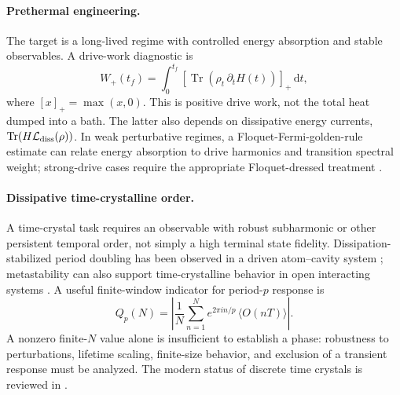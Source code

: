 \documentclass[10pt,twoside]{article}
\DeclareMathOperator{\Tr}{Tr}
\newcommand{\dd}{\,\mathrm d}
\begin{document}
\paragraph{Prethermal engineering.} The target is a long-lived regime with controlled energy absorption and stable observables. A drive-work diagnostic is
\begin{equation}
W_{+}(t_f)=\int_0^{t_f}\left[\Tr\!\left(\rho_t\,\partial_t H(t)\right)\right]_{+}\dd t,
\label{eq:work}
\end{equation}
where $[x]_+=\max(x,0)$. This is positive drive work, not the total heat dumped into a bath. The latter also depends on dissipative energy currents, $\Tr(H\mathcal L_{\rm diss}(\rho))$. In weak perturbative regimes, a Floquet-Fermi-golden-rule estimate can relate energy absorption to drive harmonics and transition spectral weight; strong-drive cases require the appropriate Floquet-dressed treatment \citep{ikeda2021floquetfgr}.

\paragraph{Dissipative time-crystalline order.} A time-crystal task requires an observable with robust subharmonic or other persistent temporal order, not simply a high terminal state fidelity. Dissipation-stabilized period doubling has been observed in a driven atom--cavity system \citep{kessler2021dissipativetimecrystal}; metastability can also support time-crystalline behavior in open interacting systems \citep{gambetta2019openDTC}. A useful finite-window indicator for period-$p$ response is
\begin{equation}
Q_p(N)=\left|\frac{1}{N}\sum_{n=1}^{N}e^{2\pi i n/p}\,\langle O(nT)\rangle\right|.
\label{eq:orderparameter}
\end{equation}
A nonzero finite-$N$ value alone is insufficient to establish a phase: robustness to perturbations, lifetime scaling, finite-size behavior, and exclusion of a transient response must be analyzed. The modern status of discrete time crystals is reviewed in \citep{yao2023colloquium}.
\end{document}
